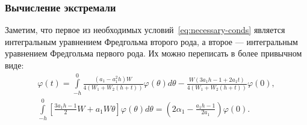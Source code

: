 \documentclass[a4paper,14pt]{article}
\begin{document}
\subsubsection{Вычисление экстремали}
Заметим, что первое из необходимых условий~\eqref{eq:necessary-conds} является
интегральным уравнением Фредгольма второго рода, а второе --- интегральным
уравнением Фредгольма первого рода. Их можно переписать в более привычном виде:
\begin{equation*}
  \begin{gathered}
    \varphi(t)
    =
    \int\limits_{-h}^{0}
      \frac{(a_1 - a_1^2 h) W}{4 (W_1 + W_2 (h + t))}
      \varphi(\theta) d\theta
    -
    \frac{W (3 a_1 h - 1 + 2 a_1 t)}{4 (W_1 + W_2 (h + t))}
    \varphi(0), \\
    \int\limits_{-h}^{0}
    \left[
      \frac{3 a_1 h - 1}{2}
      W
      +
      a_1 W \theta
    \right] \varphi(\theta) d\theta
    =
    \left(
      2 \alpha_1
      -
      \frac{a_1 h - 1}{2 a_1}
    \right)
    \varphi(0).
  \end{gathered}
\end{equation*}
\end{document}

